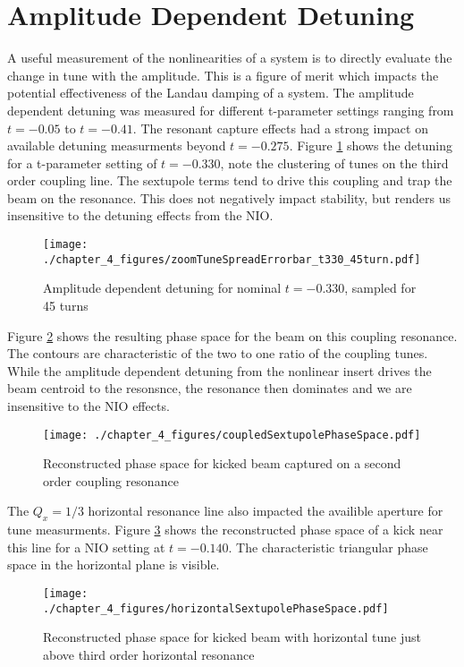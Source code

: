 \section{Amplitude Dependent Detuning} \label{sec:ampDetune}
A useful measurement of the nonlinearities of a system is to directly evaluate the change in tune with the amplitude. This is a figure of merit which impacts the potential effectiveness of the Landau damping of a system. The amplitude dependent detuning was measured for different t-parameter settings ranging from $t=-0.05$ to $t=-0.41$. The resonant capture effects had a strong impact on available detuning measurments beyond $t=-0.275$. Figure \ref{fig:t330Detuning} shows the detuning for a t-parameter setting of $t=-0.330$, note the clustering of tunes on the third order coupling line. The sextupole terms tend to drive this coupling and trap the beam on the resonance. This does not negatively impact stability, but renders us insensitive to the detuning effects from the NIO.

\begin{figure}
	\centering
	\texttt{[image: ./chapter\_4\_figures/zoomTuneSpreadErrorbar\_t330\_45turn.pdf]}
	\caption{Amplitude dependent detuning for nominal $t=-0.330$, sampled for 45 turns}
	\label{fig:t330Detuning}
\end{figure}


Figure \ref{fig:t330phaseSpace} shows the resulting phase space for the beam on this coupling resonance. The contours are characteristic of the two to one ratio of the coupling tunes. While the amplitude dependent detuning from the nonlinear insert drives the beam centroid to the resonsnce, the resonance then dominates and we are insensitive to the NIO effects.

\begin{figure}
	\centering
	\texttt{[image: ./chapter\_4\_figures/coupledSextupolePhaseSpace.pdf]}
	\caption{Reconstructed phase space for kicked beam captured on a second order coupling resonance}
	\label{fig:t330phaseSpace}
\end{figure}

The $Q_x = 1/3$ horizontal resonance line also impacted the availible aperture for tune measurments. Figure \ref{fig:t140phaseSpace} shows the reconstructed phase space of a kick near this line for a NIO setting at $t=-0.140$. The characteristic triangular phase space in the horizontal plane is visible.

\begin{figure}
	\centering
	\texttt{[image: ./chapter\_4\_figures/horizontalSextupolePhaseSpace.pdf]}
	\caption{Reconstructed phase space for kicked beam with horizontal tune just above third order horizontal resonance}
	\label{fig:t140phaseSpace}
\end{figure}


